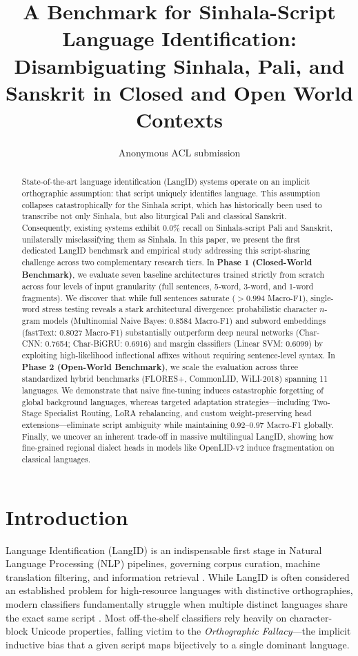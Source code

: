\documentclass[11pt]{article}
\title{A Benchmark for Sinhala-Script Language Identification: \\ Disambiguating Sinhala, Pali, and Sanskrit in Closed and Open World Contexts}
\author{Anonymous ACL submission}
\begin{document}
\maketitle

\begin{abstract}
State-of-the-art language identification (LangID) systems operate on an implicit orthographic assumption: that script uniquely identifies language. This assumption collapses catastrophically for the Sinhala script, which has historically been used to transcribe not only Sinhala, but also liturgical Pali and classical Sanskrit. Consequently, existing systems exhibit 0.0\% recall on Sinhala-script Pali and Sanskrit, unilaterally misclassifying them as Sinhala. In this paper, we present the first dedicated LangID benchmark and empirical study addressing this script-sharing challenge across two complementary research tiers. In \textbf{Phase 1 (Closed-World Benchmark)}, we evaluate seven baseline architectures trained strictly from scratch across four levels of input granularity (full sentences, 5-word, 3-word, and 1-word fragments). We discover that while full sentences saturate ($>0.994$ Macro-F1), single-word stress testing reveals a stark architectural divergence: probabilistic character $n$-gram models (Multinomial Naive Bayes: 0.8584 Macro-F1) and subword embeddings (fastText: 0.8027 Macro-F1) substantially outperform deep neural networks (Char-CNN: 0.7654; Char-BiGRU: 0.6916) and margin classifiers (Linear SVM: 0.6099) by exploiting high-likelihood inflectional affixes without requiring sentence-level syntax. In \textbf{Phase 2 (Open-World Benchmark)}, we scale the evaluation across three standardized hybrid benchmarks (FLORES+, CommonLID, WiLI-2018) spanning 11 languages. We demonstrate that naive fine-tuning induces catastrophic forgetting of global background languages, whereas targeted adaptation strategies—including Two-Stage Specialist Routing, LoRA rebalancing, and custom weight-preserving head extensions—eliminate script ambiguity while maintaining $0.92$--$0.97$ Macro-F1 globally. Finally, we uncover an inherent trade-off in massive multilingual LangID, showing how fine-grained regional dialect heads in models like OpenLID-v2 induce fragmentation on classical languages.
\end{abstract}

\section{Introduction}
Language Identification (LangID) is an indispensable first stage in Natural Language Processing (NLP) pipelines, governing corpus curation, machine translation filtering, and information retrieval \cite{jauhiainen2019automatic,lui2012langid,joulin2017bag,kargaran2023glotlid}. While LangID is often considered an established problem for high-resource languages with distinctive orthographies, modern classifiers fundamentally struggle when multiple distinct languages share the exact same script \cite{caswell2020language,dunn2023commonlid,burchell2023openlid}. Most off-the-shelf classifiers rely heavily on character-block Unicode properties, falling victim to the \textit{Orthographic Fallacy}—the implicit inductive bias that a given script maps bijectively to a single dominant language.
\end{document}
